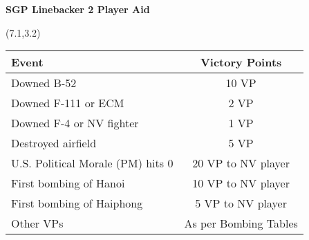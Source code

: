 \documentclass[parskip]{scrartcl}
\begin{document}

\makeatletter
\newcommand{\veryHuge}{\fontsize{50}{60}\selectfont} %
\makeatother

\begin{center}
  \veryHuge \textbf{SGP Linebacker 2 Player Aid}
\end{center}

\begin{textblock}{8}(7.1,3.2) %
  \renewcommand{\arraystretch}{1.2}
  \begin{tabular}{l c}
    \hline
    \textbf{Event} & \textbf{Victory Points} \\
    \hline
    Downed B-52 & 10 VP \\
    Downed F-111 or ECM & 2 VP \\
    Downed F-4 or NV fighter & 1 VP \\
    Destroyed airfield & 5 VP \\
    U.S. Political Morale (PM) hits 0 & 20 VP to NV player \\
    First bombing of Hanoi & 10 VP to NV player \\
    First bombing of Haiphong & 5 VP to NV player \\
    Other VPs & As per Bombing Tables \\
    \hline
  \end{tabular}
\end{textblock}



\begin{center}
  
\end{center}

\noindent
\begin{minipage}{0.48\linewidth}
  
\end{minipage}
\hfill
\begin{minipage}{0.48\linewidth}
  
\end{minipage}
\end{document}
